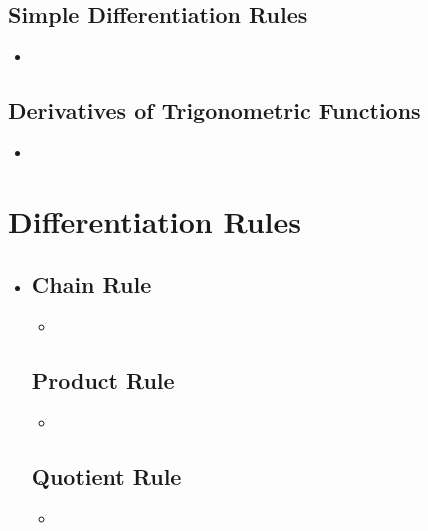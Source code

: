 \begin{itemize}
  \subsection{Simple Differentiation Rules}
  \begin{itemize}
    \item 
  \end{itemize}

  \subsection{Derivatives of Trigonometric Functions}
  \begin{itemize}
    \item 
  \end{itemize}
  

\end{itemize}

\section{Differentiation Rules}
\begin{itemize}
  \item []
  
  \subsection{Chain Rule}
  \begin{itemize}
    \item 
  \end{itemize}
  
  \subsection{Product Rule}
  \begin{itemize}
    \item 
  \end{itemize}

  \subsection{Quotient Rule}
  \begin{itemize}
    \item 
  \end{itemize}
  
\end{itemize}


